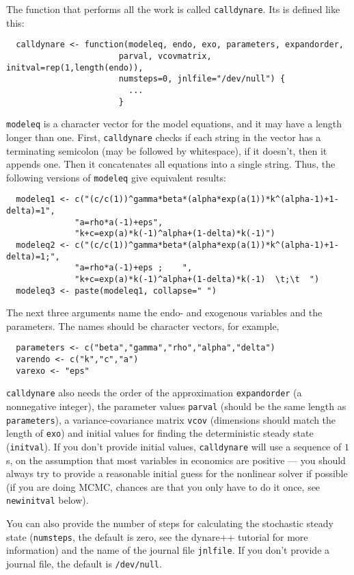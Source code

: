 \documentclass[12pt,a4paper]{article}
\begin{document}
The function that performs all the work is called
\lstinline{calldynare}.  Its is defined like this:
\begin{lstlisting}
  calldynare <- function(modeleq, endo, exo, parameters, expandorder,
                       parval, vcovmatrix, initval=rep(1,length(endo)),
                       numsteps=0, jnlfile="/dev/null") {
                         ...
                       }
\end{lstlisting}
\lstinline{modeleq} is a character vector for the model equations, and
it may have a length longer than one.  First, \lstinline{calldynare}
checks if each string in the vector has a terminating semicolon (may
be followed by whitespace), if it doesn't, then it appends one.  Then
it concatenates all equations into a single string.  Thus, the
following versions of \lstinline{modeleq} give equivalent results:
\begin{lstlisting}
  modeleq1 <- c("(c/c(1))^gamma*beta*(alpha*exp(a(1))*k^(alpha-1)+1-delta)=1",
              "a=rho*a(-1)+eps",
              "k+c=exp(a)*k(-1)^alpha+(1-delta)*k(-1)")
  modeleq2 <- c("(c/c(1))^gamma*beta*(alpha*exp(a(1))*k^(alpha-1)+1-delta)=1;",
              "a=rho*a(-1)+eps ;    ",
              "k+c=exp(a)*k(-1)^alpha+(1-delta)*k(-1)  \t;\t  ")
  modeleq3 <- paste(modeleq1, collapse=" ")
\end{lstlisting}
The next three arguments name the endo- and exogenous variables and
the parameters.  The names should be character vectors, for example,
\begin{lstlisting}
  parameters <- c("beta","gamma","rho","alpha","delta")
  varendo <- c("k","c","a")
  varexo <- "eps"
\end{lstlisting}
\lstinline{calldynare} also needs the order of the approximation
\lstinline{expandorder} (a nonnegative integer), the parameter values
\lstinline{parval} (should be the same length as
\lstinline{parameters}), a variance-covariance matrix \lstinline{vcov}
(dimensions should match the length of \lstinline{exo}) and initial
values for finding the deterministic steady state
(\lstinline{initval}).  If you don't provide initial values,
\lstinline{calldynare} will use a sequence of $1$s, on the assumption
that most variables in economics are positive --- you should always
try to provide a reasonable initial guess for the nonlinear solver if
possible (if you are doing MCMC, chances are that you only have to do
it once, see \lstinline{newinitval} below).

You can also provide the number of steps for calculating the
stochastic steady state (\lstinline{numsteps}, the default is zero,
see the dynare++ tutorial for more information) and the name of the
journal file \lstinline{jnlfile}.  If you don't provide a journal
file, the default is \verb!/dev/null!.
\end{document}
